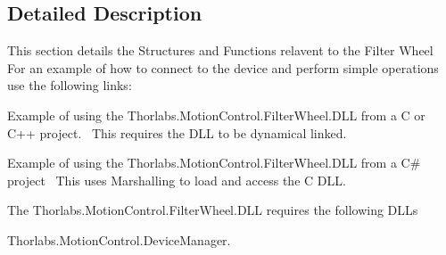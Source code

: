 

\subsection{Detailed Description}
This section details the Structures and Functions relavent to the Filter Wheel~\newline
 For an example of how to connect to the device and perform simple operations use the following links\+: 
\begin{DoxyItemize}
\item Example of using the Thorlabs.Motion\+Control.Filter\+Wheel.D\+LL from a C or C++ project.~\newline
 This requires the D\+LL to be dynamical linked.  
\item Example of using the Thorlabs.Motion\+Control.Filter\+Wheel.D\+LL from a C\# project~\newline
 This uses Marshalling to load and access the C D\+LL.  
\end{DoxyItemize}The Thorlabs.\+Motion\+Control.\+Filter\+Wheel.\+D\+LL requires the following D\+L\+Ls 
\begin{DoxyItemize}
\item Thorlabs.\+Motion\+Control.\+Device\+Manager.  
\end{DoxyItemize}

